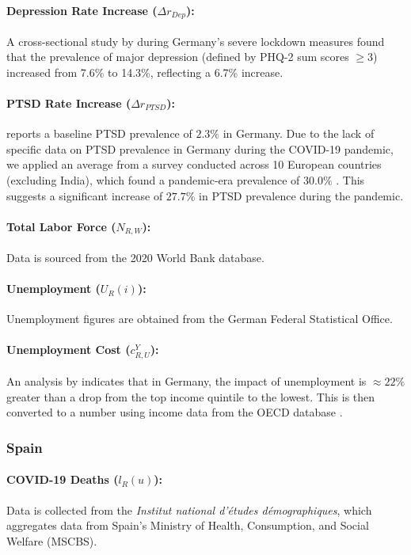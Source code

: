 \documentclass[msom,blindrev]{informs3} %
\begin{document}
\begin{APPENDICES}
\paragraph{Depression Rate Increase ($\Delta r_{Dep}$):} A cross-sectional study by  during Germany’s severe lockdown measures found that the prevalence of major depression (defined by PHQ-2 sum scores $\geq 3$) increased from 7.6\% to 14.3\%, reflecting a 6.7\% increase.

\paragraph{PTSD Rate Increase ($\Delta r_{PTSD}$):}  reports a baseline PTSD prevalence of $2.3\%$ in Germany. Due to the lack of specific data on PTSD prevalence in Germany during the COVID-19 pandemic, we applied an average from a survey conducted across 10 European countries (excluding India), which found a pandemic-era prevalence of $30.0\%$ . This suggests a significant increase of $27.7\%$ in PTSD prevalence during the pandemic.

\paragraph{Total Labor Force ($N_{R,W}$):} Data is sourced from the 2020 World Bank database.

\paragraph{Unemployment ($U_R(i)$):} Unemployment figures are obtained from the German Federal Statistical Office.

\paragraph{Unemployment Cost ($c^Y_{R,U}$):} An analysis by  indicates that in Germany, the impact of unemployment is $\approx22\%$ greater than a drop from the top income quintile to the lowest. This is then converted to a number using income data from the OECD database .


\subsubsection{Spain}
\paragraph{COVID-19 Deaths ($l_R(u)$):} Data is collected from the \emph{Institut national d'études démographiques}, which aggregates data from Spain’s Ministry of Health, Consumption, and Social Welfare (MSCBS).

\end{APPENDICES}
\end{document}
